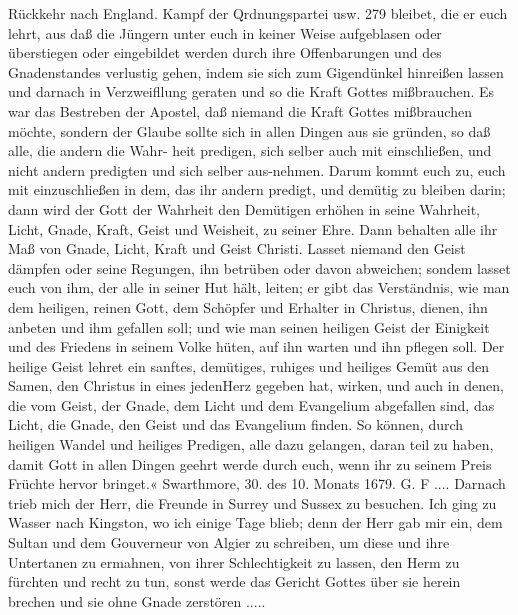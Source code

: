 Rückkehr nach England. Kampf der Qrdnungspartei usw. 279
bleibet, die er euch lehrt, aus daß die Jüngern unter euch in
keiner Weise aufgeblasen oder überstiegen oder eingebildet werden
durch ihre Offenbarungen und des Gnadenstandes verlustig gehen,
indem sie sich zum Gigendünkel hinreißen lassen und darnach in
Verzweifllung geraten und so die Kraft Gottes mißbrauchen.
Es war das Bestreben der Apostel, daß niemand die Kraft
Gottes mißbrauchen möchte, sondern der Glaube sollte sich in
allen Dingen aus sie gründen, so daß alle, die andern die Wahr-
heit predigen, sich selber auch mit einschließen, und nicht andern
predigten und sich selber aus-nehmen. Darum kommt euch zu,
euch mit einzuschließen in dem, das ihr andern predigt, und demütig
zu bleiben darin; dann wird der Gott der Wahrheit den Demütigen
erhöhen in seine Wahrheit, Licht, Gnade, Kraft, Geist und
Weisheit, zu seiner Ehre. Dann behalten alle ihr Maß von
Gnade, Licht, Kraft und Geist Christi. Lasset niemand den Geist
dämpfen oder seine Regungen, ihn betrüben oder davon abweichen;
sondem lasset euch von ihm, der alle in seiner Hut hält, leiten;
er gibt das Verständnis, wie man dem heiligen, reinen Gott,
dem Schöpfer und Erhalter in Christus, dienen, ihn anbeten
und ihm gefallen soll; und wie man seinen heiligen Geist der
Einigkeit und des Friedens in seinem Volke hüten, auf ihn
warten und ihn pflegen soll. Der heilige Geist lehret ein sanftes,
demütiges, ruhiges und heiliges Gemüt aus den Samen, den
Christus in eines jedenHerz gegeben hat, wirken, und auch in denen,
die vom Geist, der Gnade, dem Licht und dem Evangelium abgefallen
sind, das Licht, die Gnade, den Geist und das Evangelium
finden. So können, durch heiligen Wandel und heiliges Predigen,
alle dazu gelangen, daran teil zu haben, damit Gott in allen
Dingen geehrt werde durch euch, wenn ihr zu seinem Preis
Früchte hervor bringet.«
Swarthmore, 30. des 10. Monats 1679. G. F ....
Darnach trieb mich der Herr, die Freunde in Surrey und
Sussex zu besuchen. Ich ging zu Wasser nach Kingston, wo ich
einige Tage blieb; denn der Herr gab mir ein, dem Sultan
und dem Gouverneur von Algier zu schreiben, um diese und
ihre Untertanen zu ermahnen, von ihrer Schlechtigkeit zu
lassen, den Herm zu fürchten und recht zu tun, sonst werde
das Gericht Gottes über sie herein brechen und sie ohne Gnade
zerstören .....

